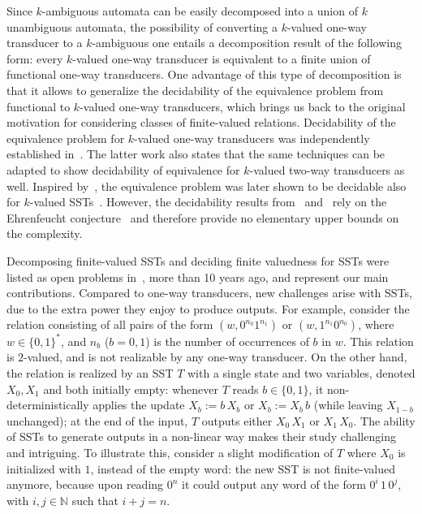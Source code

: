 \documentclass{article}
\begin{document}
Since $k$-ambiguous automata can be easily 
decomposed into a  union of $k$ unambiguous automata,
the possibility of converting a $k$-valued one-way transducer 
to a $k$-ambiguous one   entails a decomposition result of the 
following form: every $k$-valued one-way transducer is equivalent
to a finite union of functional one-way transducers.
One advantage of this type of decomposition is that it allows to generalize
the decidability of the equivalence problem from functional 
to $k$-valued one-way transducers,
which brings us back to the original motivation for considering 
classes of finite-valued relations.
Decidability of the equivalence problem for
$k$-valued one-way transducers was independently established
in~\cite{ck86}.
The latter work also states that the same techniques can be adapted 
to show decidability of equivalence for $k$-valued 
two-way transducers as well.
Inspired by~\cite{ck86}, the equivalence problem was later shown 
to be decidable also for $k$-valued SSTs~\cite{equivalence-finite-valued}.
However, the decidability results from~\cite{ck86} and~\cite{equivalence-finite-valued} 
rely on the Ehrenfeucht conjecture~\cite{AL85,Guba86} and therefore provide no elementary
upper bounds on the complexity. 



Decomposing finite-valued SSTs and deciding
finite valuedness for SSTs were listed as open problems 
in~\cite{DBLP:conf/icalp/AlurD11}, more than 10 years ago,
and represent our main contributions.
Compared to one-way transducers, new challenges arise with
SSTs, due to the extra power they enjoy to produce outputs. 
For example, consider the relation consisting of all pairs
of the form $(w, 0^{n_0}1^{n_1})$ or $(w, 1^{n_1}0^{n_0})$, 
where $w\in\{0,1\}^*$, and $n_b$ ($b=0,1$) is the number of 
occurrences of $b$ in $w$. 
This relation is $2$-valued, and is not realizable by any one-way transducer. 
On the other hand, the relation is realized by an SST $T$ with a single state 
and two variables, denoted $X_0,X_1$ and both initially empty: 
whenever $T$ reads $b\in\{0,1\}$,
it non-deterministically applies the update $X_b := b \,X_b$ or 
$X_b := X_b\,b$ (while leaving $X_{1-b}$ unchanged); at the end of
the input, $T$ outputs either $X_0 \, X_1$ or $X_1 \, X_0$. 
The ability of SSTs to generate outputs in a non-linear way
makes their study challenging and intriguing. To illustrate this, 
consider a slight modification of $T$ where
$X_0$ is initialized with $1$, instead of the empty word:
the new SST is not finite-valued anymore, because upon 
reading $0^n$ it could output any word of the form 
$0^i \,1 \, 0^j$, with $i,j\in\mathbb{N}$ such that $i+j = n$. 
\end{document}
